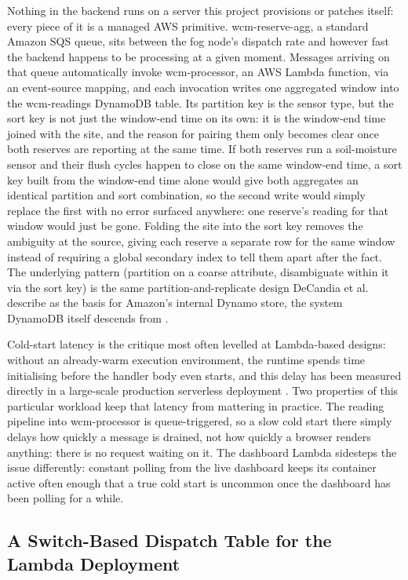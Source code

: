 \documentclass[conference,a4paper]{IEEEtran}
\begin{document}
Nothing in the backend runs on a server this project provisions or patches itself: every piece of it is a managed AWS primitive. wcm-reserve-agg, a standard Amazon SQS queue, sits between the fog node's dispatch rate and however fast the backend happens to be processing at a given moment. Messages arriving on that queue automatically invoke wcm-processor, an AWS Lambda function, via an event-source mapping, and each invocation writes one aggregated window into the wcm-readings DynamoDB table. Its partition key is the sensor type, but the sort key is not just the window-end time on its own: it is the window-end time joined with the site, and the reason for pairing them only becomes clear once both reserves are reporting at the same time. If both reserves run a soil-moisture sensor and their flush cycles happen to close on the same window-end time, a sort key built from the window-end time alone would give both aggregates an identical partition and sort combination, so the second write would simply replace the first with no error surfaced anywhere: one reserve's reading for that window would just be gone. Folding the site into the sort key removes the ambiguity at the source, giving each reserve a separate row for the same window instead of requiring a global secondary index to tell them apart after the fact. The underlying pattern (partition on a coarse attribute, disambiguate within it via the sort key) is the same partition-and-replicate design DeCandia et al. describe as the basis for Amazon's internal Dynamo store, the system DynamoDB itself descends from \cite{ref6}.

Cold-start latency is the critique most often levelled at Lambda-based designs: without an already-warm execution environment, the runtime spends time initialising before the handler body even starts, and this delay has been measured directly in a large-scale production serverless deployment \cite{ref7}. Two properties of this particular workload keep that latency from mattering in practice. The reading pipeline into wcm-processor is queue-triggered, so a slow cold start there simply delays how quickly a message is drained, not how quickly a browser renders anything: there is no request waiting on it. The dashboard Lambda sidesteps the issue differently: constant polling from the live dashboard keeps its container active often enough that a true cold start is uncommon once the dashboard has been polling for a while.

\subsection{A Switch-Based Dispatch Table for the Lambda Deployment}
\end{document}
